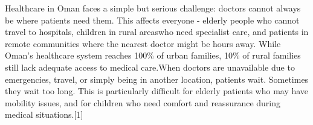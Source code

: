 Healthcare in Oman faces a simple but serious challenge: doctors cannot always be where patients need them. This affects everyone - elderly people who cannot travel to hospitals, children in rural areaswho need specialist care, and patients in remote communities where the nearest doctor might be hours away. While Oman’s healthcare system reaches 100\% of urban families, 10\% of rural families still lack adequate access to medical care.When doctors are unavailable due to emergencies, travel, or simply being in another location, patients wait. Sometimes they wait too long. This is particularly difficult for elderly patients who may have mobility issues, and for children who need comfort and reassurance during medical situations.[1]

